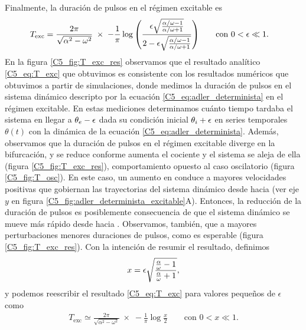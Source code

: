 \documentclass[./main.tex]{subfiles}
\begin{document}
Finalmente, la duración de pulsos en el régimen excitable es
\begin{align}
T_{\text{exc}} &=\frac{2\pi}{\sqrt{\alpha^2 - \omega^2}} \; \times \; -\frac{1}{\pi}  \log{\left( \frac{\epsilon \sqrt{\frac{\dddelta - 1}{\dddelta + 1}}}{2-\epsilon \sqrt{\frac{\dddelta - 1}{\dddelta + 1}}}\right)} \qquad \text{con } 0<\epsilon \ll 1.
    \label{C5_eq:T_exc}
\end{align}
En la figura \ref{C5_fig:T_exc_res} observamos que el resultado analítico \ref{C5_eq:T_exc} que obtuvimos es consistente con los resultados numéricos que obtuvimos a partir de simulaciones, donde medimos la duración de pulsos en el sistema dinámico descripto por la ecuación \ref{C5_eq:adler_determinista} en el régimen excitable. En estas mediciones determinamos cuánto tiempo tardaba el sistema en llegar a $\theta_e-\epsilon$ dada su condición inicial $\theta_i+\epsilon$ en series temporales $\theta(t)$ con la dinámica de la ecuación \ref{C5_eq:adler_determinista}. Además, observamos que la duración de pulsos en el régimen excitable diverge en la bifurcación, y se reduce conforme aumenta el cociente \dddelta y el sistema se aleja de ella (figura \ref{C5_fig:T_exc_res}), comportamiento opuesto al caso oscilatorio (figura \ref{C5_fig:T_osc}). En este caso, un aumento en \dddelta conduce a mayores velocidades positivas que gobiernan las trayectorias del sistema dinámico desde \xxi hacia \xxe (ver eje $y$ en figura \ref{C5_fig:adler_determinista_excitable}A). Entonces, la reducción de la duración de pulsos es posiblemente consecuencia de que el sistema dinámico se mueve más rápido desde \xxi hacia \xxe. Observamos, también, que a mayores perturbaciones menores duraciones de pulsos, como es esperable (figura \ref{C5_fig:T_exc_res}). Con la intención de resumir el resultado, definimos 
\begin{equation}
    x = \epsilon \sqrt{\frac{\frac{\alpha}{\omega} - 1}{\frac{\alpha}{\omega} + 1}},
\end{equation}
y podemos reescribir el resultado \ref{C5_eq:T_exc} para valores pequeños de $\epsilon$ como
\begin{align}
    T_{\text{exc}} \simeq \frac{2\pi}{\sqrt{\alpha^2 - \omega^2}} \; \times \; -\frac{1}{\pi}  \log{\frac{x}{2}} \qquad \text{con } 0<x \ll 1.
    \label{C5_eq:T_exc_aprox}
\end{align}
\end{document}
